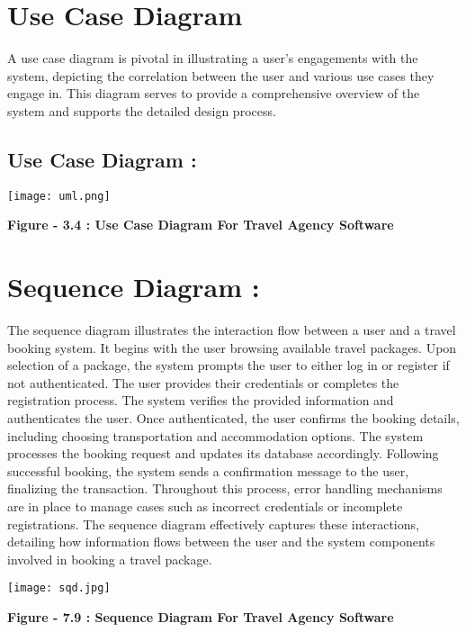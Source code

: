 \documentclass{scrreprt}
\begin{document}
\section{Use Case Diagram}

A use case diagram is pivotal in illustrating a user's engagements with the system, depicting the correlation between the user and various use cases they engage in. This diagram serves to provide a comprehensive overview of the system and supports the detailed design process.

\subsection *{ Use Case Diagram : }
{\texttt{[image: uml.png]}}

\begin{center}
    \parbox{0.8\textwidth}{ 
        \centering
        \textbf{Figure - 3.4 : Use Case Diagram For Travel Agency Software}
    }
\end{center}

\section{ Sequence Diagram : }

The sequence diagram illustrates the interaction flow between a user and a travel booking system. It begins with the user browsing available travel packages. Upon selection of a package, the system prompts the user to either log in or register if not authenticated. The user provides their credentials or completes the registration process. The system verifies the provided information and authenticates the user. Once authenticated, the user confirms the booking details, including choosing transportation and accommodation options. The system processes the booking request and updates its database accordingly. Following successful booking, the system sends a confirmation message to the user, finalizing the transaction. Throughout this process, error handling mechanisms are in place to manage cases such as incorrect credentials or incomplete registrations. The sequence diagram effectively captures these interactions, detailing how information flows between the user and the system components involved in booking a travel package.

{\texttt{[image: sqd.jpg]}}

\begin{center}
    \parbox{0.8\textwidth}{ 
        \centering
        \textbf{Figure - 7.9 : Sequence Diagram For Travel Agency Software}
    }
\end{center}
\end{document}
